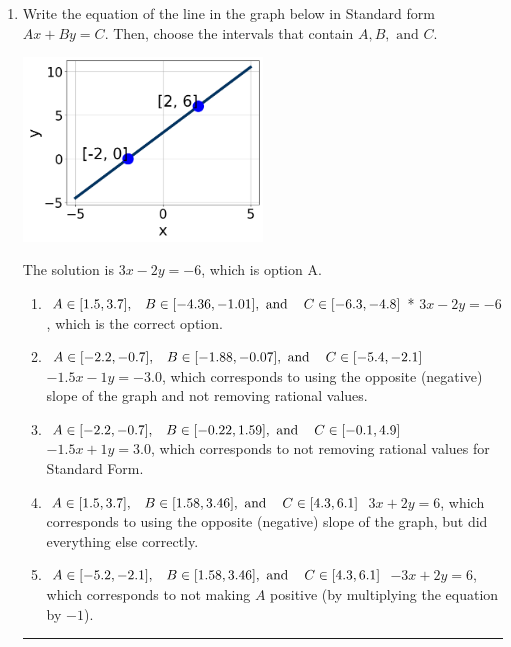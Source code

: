\documentclass{extbook}[14pt]
\newcommand{\litem}[1]{\item#1\hspace*{-1cm}\rule{\textwidth}{0.4pt}}
\begin{document}
\begin{enumerate}\litem{
Write the equation of the line in the graph below in Standard form $Ax+By=C$. Then, choose the intervals that contain $A, B, \text{ and } C$.

\begin{center}
    \includegraphics[width=0.5\textwidth]{../Figures/linearGraphToStandardA.png}
\end{center}

The solution is \( 3x - 2y = -6 \), which is option A.\begin{enumerate}[label=\Alph*.]
\item \( A \in [1.5, 3.7], \hspace{3mm} B \in [-4.36, -1.01], \text{ and } \hspace{3mm} C \in [-6.3, -4.8] \)* $3x - 2y = -6$, which is the correct option.
\item \( A \in [-2.2, -0.7], \hspace{3mm} B \in [-1.88, -0.07], \text{ and } \hspace{3mm} C \in [-5.4, -2.1] \) $-1.5x - 1y = -3.0$, which corresponds to using the opposite (negative) slope of the graph and not removing rational values.
\item \( A \in [-2.2, -0.7], \hspace{3mm} B \in [-0.22, 1.59], \text{ and } \hspace{3mm} C \in [-0.1, 4.9] \) $-1.5x + 1y = 3.0$, which corresponds to not removing rational values for Standard Form.
\item \( A \in [1.5, 3.7], \hspace{3mm} B \in [1.58, 3.46], \text{ and } \hspace{3mm} C \in [4.3, 6.1] \) $3x + 2y = 6$, which corresponds to using the opposite (negative) slope of the graph, but did everything else correctly.
\item \( A \in [-5.2, -2.1], \hspace{3mm} B \in [1.58, 3.46], \text{ and } \hspace{3mm} C \in [4.3, 6.1] \) $-3x + 2y = 6$, which corresponds to not making $A$ positive (by multiplying the equation by $-1$).
\end{enumerate}

}
\end{enumerate}
\end{document}
